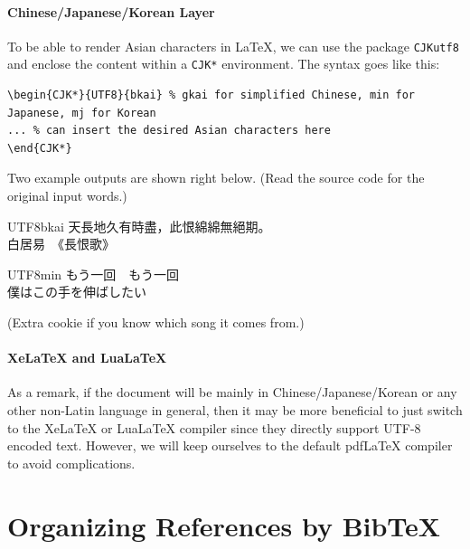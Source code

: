 \paragraph{Chinese/Japanese/Korean Layer}
To be able to render Asian characters in \LaTeX{}, we can use the package \texttt{CJKutf8} and enclose the content within a \texttt{CJK*} environment. The syntax goes like this:
\begin{lstlisting}
\begin{CJK*}{UTF8}{bkai} % gkai for simplified Chinese, min for Japanese, mj for Korean
... % can insert the desired Asian characters here
\end{CJK*}     
\end{lstlisting}
Two example outputs are shown right below. (Read the source code for the original input words.) \par
\begin{CJK*}{UTF8}{bkai}
\raggedleft
天長地久有時盡，此恨綿綿無絕期。\\
白居易　《長恨歌》 \par
\end{CJK*}
\begin{CJK*}{UTF8}{min}
もう一回　もう一回\\
僕はこの手を伸ばしたい
\end{CJK*} (Extra cookie if you know which song it comes from.)

\paragraph{XeLaTeX and LuaLaTeX}
As a remark, if the document will be mainly in Chinese/Japanese/Korean or any other non-Latin language in general, then it may be more beneficial to just switch to the XeLaTeX or LuaLaTeX compiler since they directly support UTF-8 encoded text. However, we will keep ourselves to the default pdfLaTeX compiler to avoid complications.

\section{Organizing References by BibTeX}

